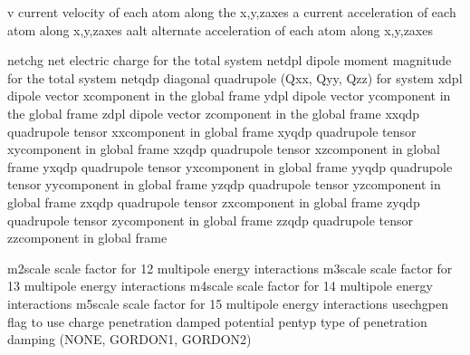 \documentclass[letterpaper,11pt,english]{sphinxmanual}
\begin{document}
\begin{sphinxVerbatim}[commandchars=\\\{\}]
v               current velocity of each atom along the x,y,z\PYGZhy{}axes
a               current acceleration of each atom along x,y,z\PYGZhy{}axes
aalt            alternate acceleration of each atom along x,y,z\PYGZhy{}axes
\end{sphinxVerbatim}

\sphinxAtStartPar
{}

\begin{sphinxVerbatim}[commandchars=\\\{\}]
netchg          net electric charge for the total system
netdpl          dipole moment magnitude for the total system
netqdp          diagonal quadrupole (Qxx, Qyy, Qzz) for system
xdpl            dipole vector x\PYGZhy{}component in the global frame
ydpl            dipole vector y\PYGZhy{}component in the global frame
zdpl            dipole vector z\PYGZhy{}component in the global frame
xxqdp           quadrupole tensor xx\PYGZhy{}component in global frame
xyqdp           quadrupole tensor xy\PYGZhy{}component in global frame
xzqdp           quadrupole tensor xz\PYGZhy{}component in global frame
yxqdp           quadrupole tensor yx\PYGZhy{}component in global frame
yyqdp           quadrupole tensor yy\PYGZhy{}component in global frame
yzqdp           quadrupole tensor yz\PYGZhy{}component in global frame
zxqdp           quadrupole tensor zx\PYGZhy{}component in global frame
zyqdp           quadrupole tensor zy\PYGZhy{}component in global frame
zzqdp           quadrupole tensor zz\PYGZhy{}component in global frame
\end{sphinxVerbatim}

\sphinxAtStartPar
{}

\begin{sphinxVerbatim}[commandchars=\\\{\}]
m2scale         scale factor for 1\PYGZhy{}2 multipole energy interactions
m3scale         scale factor for 1\PYGZhy{}3 multipole energy interactions
m4scale         scale factor for 1\PYGZhy{}4 multipole energy interactions
m5scale         scale factor for 1\PYGZhy{}5 multipole energy interactions
use\PYGZus{}chgpen      flag to use charge penetration damped potential
pentyp          type of penetration damping (NONE, GORDON1, GORDON2)
\end{sphinxVerbatim}
\end{document}

